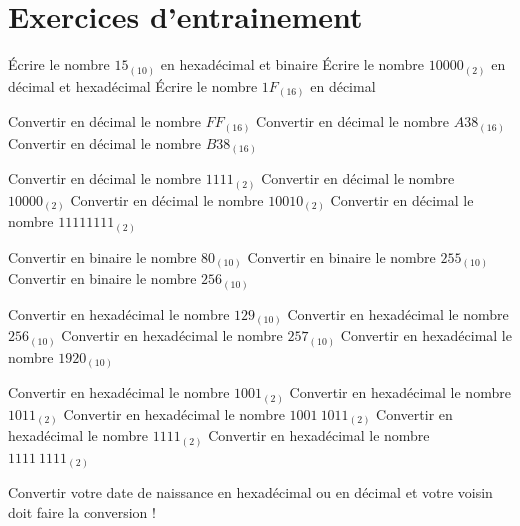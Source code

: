 \setcounter{chapter}{0}
\setcounter{section}{0}
\section*{Exercices d'entrainement}
\begin{Exercise}[title = {Comprendre les bases 2, 10 et 16}]
    \Question Écrire le nombre $15_{(10)}$ en hexadécimal et binaire
    \Question Écrire le nombre $10000_{(2)}$ en décimal et hexadécimal
    \Question Écrire le nombre $1F_{(16)}$ en décimal
\end{Exercise}
\vspace{-0.7cm}
\begin{Exercise}[title = Conversion de la base 16 à la base 10]
    \Question Convertir en décimal le nombre $FF_{(16)}$
    \Question Convertir en décimal le nombre $A38_{(16)}$
    \Question Convertir en décimal le nombre $B38_{(16)}$
\end{Exercise}
\vspace{-0.7cm}
\begin{Exercise}[title = Conversion de la base 2 à la base 10]
    \Question Convertir en décimal le nombre $1111_{(2)}$
    \Question Convertir en décimal le nombre $10000_{(2)}$
    \Question Convertir en décimal le nombre $10010_{(2)}$
    \Question Convertir en décimal le nombre $1111 1111_{(2)}$
\end{Exercise}
\vspace{-0.7cm}
\begin{Exercise} [title = Conversion de la base 10 à la base 2]
    \Question Convertir en binaire le nombre $80_{(10)}$
    \Question Convertir en binaire le nombre $255_{(10)}$
    \Question Convertir en binaire le nombre $256_{(10)}$
\end{Exercise}
\vspace{-0.7cm}
\begin{Exercise}[title = Conversion de la base 10 à la base 16]
    \Question Convertir en hexadécimal le nombre $129_{(10)}$
    \Question Convertir en hexadécimal le nombre $256_{(10)}$
    \Question Convertir en hexadécimal le nombre $257_{(10)}$
    \Question Convertir en hexadécimal le nombre $1920_{(10)}$
\end{Exercise}
\vspace{-0.7cm}
\begin{Exercise}[title = Conversion de la base 2 à la base 16]
    \Question Convertir en hexadécimal le nombre $1001_{(2)}$
    \Question Convertir en hexadécimal le nombre $1011_{(2)}$
    \Question Convertir en hexadécimal le nombre $1001~1011_{(2)}$
    \Question Convertir en hexadécimal le nombre $1111_{(2)}$
    \Question Convertir en hexadécimal le nombre $1111~ 1111_{(2)}$ 
\end{Exercise}
\vspace{-0.7cm}
\begin{Exercise}[title = Bonus]
    \Question Convertir votre date de naissance en hexadécimal ou en décimal et votre voisin doit faire la conversion !
\end{Exercise}

